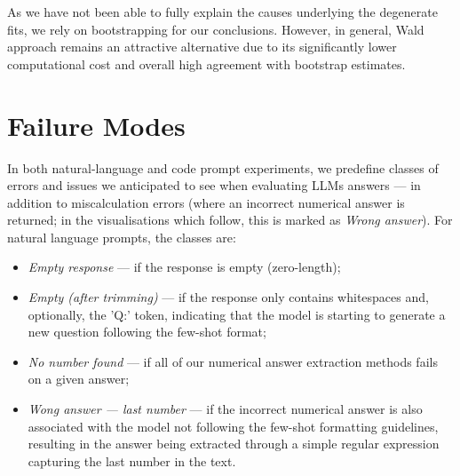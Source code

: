 \documentclass[11pt]{article}
\begin{document}
As we have not been able to fully explain the causes underlying the degenerate fits, we rely on bootstrapping for our conclusions. However, in general, Wald approach remains an attractive alternative due to its significantly lower computational cost and overall high agreement with bootstrap estimates.

\newpage

\section{Failure Modes}\label{apx:error-types}
In both natural-language and code prompt experiments, we predefine classes of errors and issues we anticipated to see when evaluating LLMs answers --- in addition to miscalculation errors (where an incorrect numerical answer is returned; in the visualisations which follow, this is marked as \textit{Wrong answer}). For natural language prompts, the classes are:

\begin{itemize}
    \item \textit{Empty response} --- if the response is empty (zero-length);
    \item \textit{Empty (after trimming)} --- if the response only contains whitespaces and, optionally, the 'Q:' token, indicating that the model is starting to generate a new question following the few-shot format;
    \item \textit{No number found} --- if all of our numerical answer extraction methods fails on a given answer;
    \item \textit{Wong answer --- last number} --- if the incorrect numerical answer is also associated with the model not following the few-shot formatting guidelines, resulting in the answer being extracted through a simple regular expression capturing the last number in the text.
\end{itemize}
\end{document}
